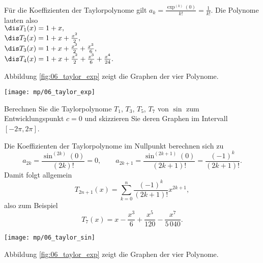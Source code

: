 \begin{antwort}
  Für die Koeffizienten der Taylorpolynome gilt 
  $a_k = \frac{\exp^{(k)}(0)}{k!}= \frac{1}{k!}$. 
  Die Polynome lauten also\\[1.5mm]
  \hspace*{0.5cm}$\dis T_1(x) = 1+x,$ \\[1.5mm]
  \hspace*{0.5cm}$\dis T_2(x) = 1+x+\frac{x^2}{2},$\\[1.5mm]
  \hspace*{0.5cm}$\dis T_3(x) = 1+x+\frac{x^2}{2}+\frac{x^3}{6},$ \\[1.5mm]
  \hspace*{0.5cm}$\dis T_4(x) = 1+x+\frac{x^2}{2}+\frac{x^3}{6}+\frac{x^4}{24}.$
  \hspace*{1cm}\proofsymbol

  Abbildung \ref{fig:06_taylor_exp} zeigt die Graphen der vier Polynome.

  \begin{center}
    \texttt{[image: mp/06\_taylor\_exp]}
    \label{fig:06_taylor_exp}
  \end{center}

\end{antwort}

\begin{frage}
  Berechnen Sie die Taylorpolynome $T_1$, $T_3$, $T_5$, $T_7$ 
  von $\sin$ zum Entwicklungspunkt $c=0$ und skizzieren 
  Sie deren Graphen im Intervall $[-2\pi,2\pi]$.
\end{frage}

\begin{antwort}
  Die Koeffizienten der Taylorpolynome 
  im Nullpunkt berechnen sich zu 
  \[
  a_{2k} = \frac{\sin^{(2k)}(0)}{(2k)!} = 0, \qquad
  a_{2k+1} = \frac{\sin^{(2k+1)}(0)}{(2k+1)!} = \frac{(-1)^k}{(2k+1)!}. 
  \]
  Damit folgt allgemein
  \[
  T_{2n+1}(x) = \sum_{k=0}^n \frac{(-1)^k}{(2k+1)!} x^{2k+1}, 
  \]
  also zum Beispiel
  \begin{equation}
    T_7 (x) = x-\frac{x^3}{6}+\frac{x^5}{120}-\frac{x^7}{5\,040}.
   \end{equation}

  \begin{center}
    \texttt{[image: mp/06\_taylor\_sin]}
    \label{fig:06_taylor_sin}
  \end{center}

  Abbildung \ref{fig:06_taylor_exp} zeigt die Graphen der vier Polynome.
  \AntEnd
\end{antwort}

